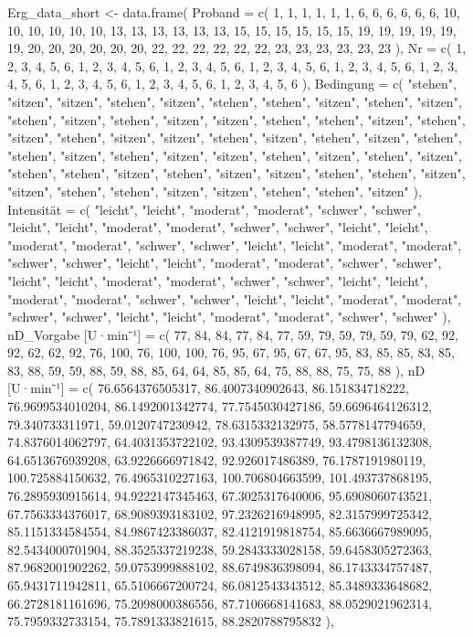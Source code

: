 \documentclass[
  letterpaper,
  DIV=11]{scrartcl}
\newenvironment{Shaded}{\begin{snugshade}}{\end{snugshade}}
\newcommand{\NormalTok}[1]{\textcolor[rgb]{0.00,0.23,0.31}{#1}}
\begin{document}
\begin{Shaded}
\begin{Highlighting}[]
\NormalTok{Erg\_data\_short \textless{}{-} data.frame(}
\NormalTok{  \textasciigrave{}Proband\textasciigrave{} = c( 1, 1, 1, 1, 1, 1, 6, 6, 6, 6, 6, 6, 10, 10, 10, 10, 10, 10, 13, 13, 13, 13, 13, 13, 15, 15, 15, 15, 15, 15, 19, 19, 19, 19, 19, 19, 20, 20, 20, 20, 20, 20, 22, 22, 22, 22, 22, 22, 23, 23, 23, 23, 23, 23 ),}
\NormalTok{  \textasciigrave{}Nr\textasciigrave{} = c( 1, 2, 3, 4, 5, 6, 1, 2, 3, 4, 5, 6, 1, 2, 3, 4, 5, 6, 1, 2, 3, 4, 5, 6, 1, 2, 3, 4, 5, 6, 1, 2, 3, 4, 5, 6, 1, 2, 3, 4, 5, 6, 1, 2, 3, 4, 5, 6, 1, 2, 3, 4, 5, 6 ),}
\NormalTok{  \textasciigrave{}Bedingung\textasciigrave{} = c( "stehen", "sitzen", "sitzen", "stehen", "sitzen", "stehen", "stehen", "sitzen", "stehen", "sitzen", "stehen", "sitzen", "stehen", "sitzen", "sitzen", "stehen", "stehen", "sitzen", "stehen", "sitzen", "stehen", "sitzen", "sitzen", "stehen", "sitzen", "stehen", "sitzen", "stehen", "stehen", "sitzen", "stehen", "sitzen", "sitzen", "stehen", "sitzen", "stehen", "sitzen", "stehen", "stehen", "sitzen", "stehen", "sitzen", "sitzen", "stehen", "stehen", "sitzen", "sitzen", "stehen", "stehen", "sitzen", "sitzen", "stehen", "stehen", "sitzen" ),}
\NormalTok{  \textasciigrave{}Intensität\textasciigrave{} = c( "leicht", "leicht", "moderat", "moderat", "schwer", "schwer", "leicht", "leicht", "moderat", "moderat", "schwer", "schwer", "leicht", "leicht", "moderat", "moderat", "schwer", "schwer", "leicht", "leicht", "moderat", "moderat", "schwer", "schwer", "leicht", "leicht", "moderat", "moderat", "schwer", "schwer", "leicht", "leicht", "moderat", "moderat", "schwer", "schwer", "leicht", "leicht", "moderat", "moderat", "schwer", "schwer", "leicht", "leicht", "moderat", "moderat", "schwer", "schwer", "leicht", "leicht", "moderat", "moderat", "schwer", "schwer" ),}
\NormalTok{  \textasciigrave{}nD\_Vorgabe [U·min⁻¹]\textasciigrave{} = c( 77, 84, 84, 77, 84, 77, 59, 79, 59, 79, 59, 79, 62, 92, 92, 62, 62, 92, 76, 100, 76, 100, 100, 76, 95, 67, 95, 67, 67, 95, 83, 85, 85, 83, 85, 83, 88, 59, 59, 88, 59, 88, 85, 64, 64, 85, 85, 64, 75, 88, 88, 75, 75, 88 ),}
\NormalTok{  \textasciigrave{}nD [U·min⁻¹]\textasciigrave{} = c( 76.6564376505317, 86.4007340902643, 86.151834718222, 76.9699534010204, 86.1492001342774, 77.7545030427186, 59.6696464126312, 79.340733311971, 59.0120747230942, 78.6315332132975, 58.5778147794659, 74.8376014062797, 64.4031353722102, 93.4309539387749, 93.4798136132308, 64.6513676939208, 63.9226666971842, 92.926017486389, 76.1787191980119, 100.725884150632, 76.4965310227163, 100.706804663599, 101.493737868195, 76.2895930915614, 94.9222147345463, 67.3025317640006, 95.6908060743521, 67.7563334376017, 68.9089393183102, 97.2326216948995, 82.3157999725342, 85.1151334584554, 84.9867423386037, 82.4121919818754, 85.6636667989095, 82.5434000701904, 88.3525337219238, 59.2843333028158, 59.6458305272363, 87.9682001902262, 59.0753999888102, 88.6749836398094, 86.1743334757487, 65.9431711942811, 65.5106667200724, 86.0812543343512, 85.3489333648682, 66.2728181161696, 75.2098000386556, 87.7106668141683, 88.0529021962314, 75.7959332733154, 75.7891333821615, 88.2820788795832 ),}

\end{Highlighting}
\end{Shaded}
\end{document}

